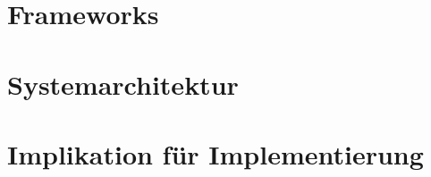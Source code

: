 \section{Frameworks}

\section{Systemarchitektur}












\section{Implikation für Implementierung}

